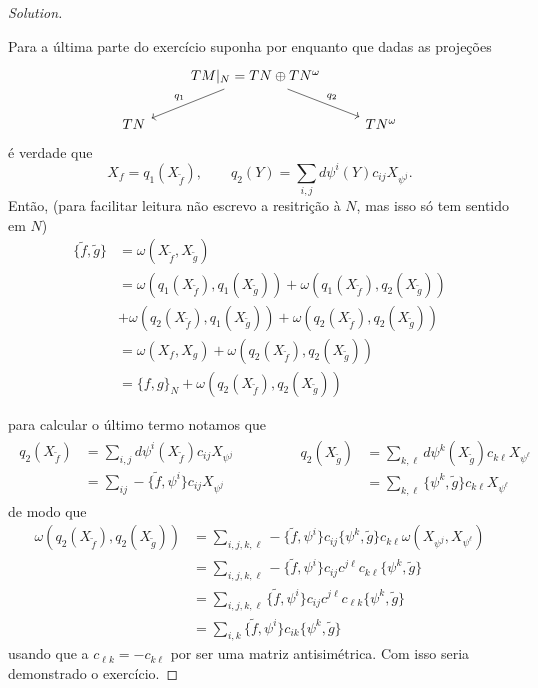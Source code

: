 \begin{proof}[Solution]
\begin{enumerate}[label=\alph*.]
Para a última parte do exercício suponha por enquanto que dadas as proje\c c\~oes
\[\begin{tikzcd}
&TM|_{N}=T N\oplus T N^\omega\arrow[dl,"q_1",swap]\arrow[dr,"q_2"]\\
T N&&T N^{\omega}
\end{tikzcd}\]
\'e verdade que
\[X_f=q_1(X_{\tilde{f}}),\qquad q_2(Y)=\sum_{i,j}d\psi^i(Y)c_{ij}X_{\psi^j}.\]
Ent\~ao, (para facilitar leitura n\~ao escrevo a resitri\c c\~ao à $N$, mas isso s\'o tem sentido em $N$)
\begin{align*}
	\{\tilde{f},\tilde{g}\}&=\omega(X_{\tilde{f}},X_{\tilde{g}})\\
			       &=\omega(q_1(X_{\tilde{f}}),q_1(X_{\tilde{g}}))+\omega(q_1(X_{\tilde{f}}),q_2(X_{\tilde{g}}))\\
	&+\omega(q_2(X_{\tilde{f}}),q_1(X_{\tilde{g}}))+\omega(q_2(X_{\tilde{f}}),q_2(X_{\tilde{g}}))\\
	&=\omega(X_{f},X_{g})+\omega(q_2(X_{\tilde{f}}),q_2(X_{\tilde{g}}))\\
	&=\{f,g\}_{N}+\omega(q_2(X_{\tilde{f}}),q_2(X_{\tilde{g}}))
\end{align*}
	\end{enumerate}
	para calcular o \'ultimo termo notamos que
	\begin{align*}
		\begin{aligned}
		q_2(X_{\tilde{f}})&=\sum_{i,j}d\psi^i(X_{\tilde{f}})c_{ij}X_{\psi^j}\\
		&=\sum_{ij}-\{\tilde{f},\psi^i\} c_{ij}X_{\psi^j}
	\end{aligned}\qquad\quad \quad 
	\begin{aligned}
		q_2(X_{\tilde{g}})&=\sum_{k,\ell}d\psi^k(X_{\tilde{g}})c_{k \ell}X_{\psi^\ell}\\
		&=\sum_{k,\ell}\{\psi^k,\tilde{g}\} c_{k \ell}X_{\psi^\ell}
	\end{aligned}
	\end{align*}
	de modo que
	\begin{align*}
		\omega(q_2(X_{\tilde{f}}),q_2(X_{\tilde{g}}))&=\sum_{i,j,k,\ell} -\{\tilde{f},\psi^i\} c_{ij}\{\psi^k,\tilde{g}\} c_{k \ell}\omega(X_{\psi^j},X_{\psi^\ell})\\
	&=\sum_{i,j,k,\ell} -\{\tilde{f},\psi^i\} c_{ij}c^{j\ell}c_{k \ell}\{\psi^k,\tilde{g}\}\\
	&=\sum_{i,j,k,\ell} \{\tilde{f},\psi^i\} c_{ij}c^{j\ell}c_{\ell k}\{\psi^k,\tilde{g}\}\\
	&=\sum_{i,k} \{\tilde{f},\psi^i\} c_{i k}\{\psi^k,\tilde{g}\}
	\end{align*}
	usando que a $c_{\ell k}=-c_{k\ell}$ por ser uma matriz antisim\'etrica. Com isso seria demonstrado o exerc\'icio.


\end{proof}
